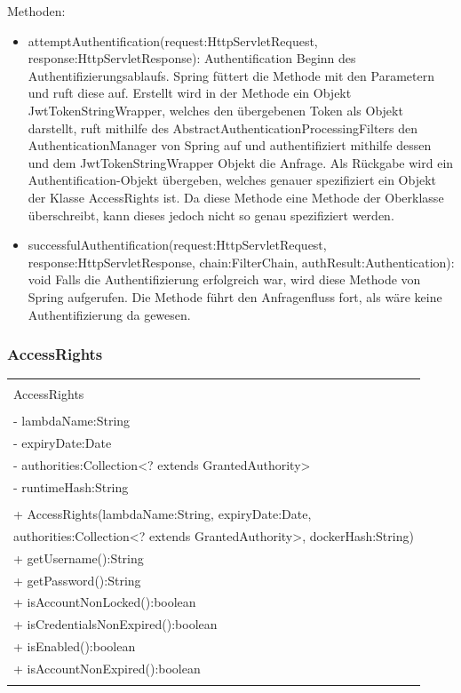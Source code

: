 \documentclass[a4paper,20pt,oneside]{book}
\begin{document}
	Methoden:
	\begin{itemize}
	\item attemptAuthentification(request:HttpServletRequest, response:HttpServletResponse): Authentification\linebreak
	Beginn des Authentifizierungsablaufs. Spring füttert die Methode mit den Parametern und ruft diese auf. Erstellt wird in der Methode ein Objekt JwtTokenStringWrapper, welches den übergebenen Token als Objekt darstellt, ruft mithilfe des AbstractAuthenticationProcessingFilters den AuthenticationManager von Spring auf und authentifiziert mithilfe dessen und dem JwtTokenStringWrapper Objekt die Anfrage. Als Rückgabe wird ein Authentification-Objekt übergeben, welches genauer spezifiziert ein Objekt der Klasse AccessRights ist. Da diese Methode eine Methode der Oberklasse überschreibt, kann dieses jedoch nicht so genau spezifiziert werden.
	\item successfulAuthentification(request:HttpServletRequest, response:HttpServletResponse, chain:FilterChain, authResult:Authentication): void\linebreak
	Falls die Authentifizierung erfolgreich war, wird diese Methode von Spring aufgerufen. Die Methode führt den Anfragenfluss fort, als wäre keine Authentifizierung da gewesen.
	\end{itemize}	
	
	\subsubsection{AccessRights}
\centering
	\begin{tabular}{|l|}
	\hline \\
	AccessRights \\ \hline \\
	- lambdaName:String\\
	- expiryDate:Date\\
	- authorities:Collection<? extends GrantedAuthority>\\
	- runtimeHash:String
	\\ 
	\hline \\
	+ AccessRights(lambdaName:String, expiryDate:Date, \\ authorities:Collection<? extends GrantedAuthority>, dockerHash:String) \\
	+ getUsername():String\\
	+ getPassword():String \\
	+ isAccountNonLocked():boolean\\
	+ isCredentialsNonExpired():boolean\\
	+ isEnabled():boolean\\ 
	+ isAccountNonExpired():boolean\\
 \\ \hline
	\end{tabular}
 
\end{document}
